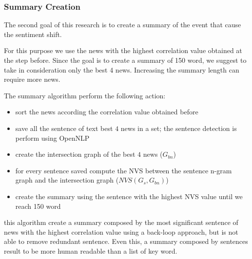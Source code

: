 \subsubsection*{Summary Creation}
The second goal of this research is to create a summary of the event that cause the sentiment shift. 

For this purpose we use the news with the highest correlation value obtained at the step before.
Since the goal is to create a summary of 150 word, we suggest to take in consideration only the best 4 news. Increasing the summary length can require more news.

The summary algorithm perform the following action:
\begin{itemize}
	\item sort the news according the correlation value obtained before
	\item save all the sentence of text best $4$ news in a set; the sentence detection is perform using OpenNLP
	\item create the intersection graph of the best $4$ news ($G_{bn}$)
	\item for every sentence saved compute the NVS between the sentence n-gram graph and the intersection graph ($NVS( G_{s}, G_{bn} )$)
	\item create the summary using the sentence with the highest NVS value until we reach 150 word
\end{itemize}
this algorithm create a summary composed by the most significant sentence of news with the highest correlation value using a back-loop approach, but is not able to remove redundant sentence. Even this, a summary composed by sentences result to be more human readable than a list of key word.
